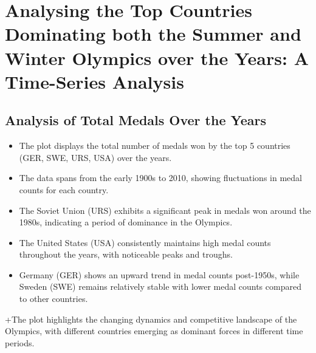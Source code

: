 \documentclass[
  12pt,
]{elsarticle}
\begin{document}
\hypertarget{analysing-the-top-countries-dominating-both-the-summer-and-winter-olympics-over-the-years-a-time-series-analysis}{%
\section{Analysing the Top Countries Dominating both the Summer and
Winter Olympics over the Years: A Time-Series
Analysis}\label{analysing-the-top-countries-dominating-both-the-summer-and-winter-olympics-over-the-years-a-time-series-analysis}}

\hypertarget{analysis-of-total-medals-over-the-years}{%
\subsection{Analysis of Total Medals Over the
Years}\label{analysis-of-total-medals-over-the-years}}

\begin{itemize}
\item
  The plot displays the total number of medals won by the top 5
  countries (GER, SWE, URS, USA) over the years.
\item
  The data spans from the early 1900s to 2010, showing fluctuations in
  medal counts for each country.
\item
  The Soviet Union (URS) exhibits a significant peak in medals won
  around the 1980s, indicating a period of dominance in the Olympics.
\item
  The United States (USA) consistently maintains high medal counts
  throughout the years, with noticeable peaks and troughs.
\item
  Germany (GER) shows an upward trend in medal counts post-1950s, while
  Sweden (SWE) remains relatively stable with lower medal counts
  compared to other countries.
\end{itemize}

+The plot highlights the changing dynamics and competitive landscape of
the Olympics, with different countries emerging as dominant forces in
different time periods.
\end{document}
